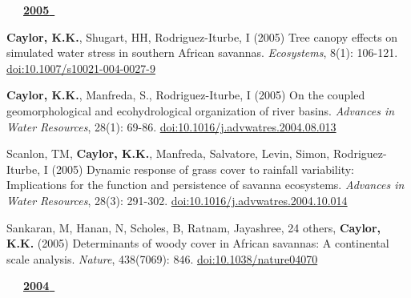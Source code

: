 \begin{etaremune}
\vspace{0.1in}
\mbox{\ \ \ \underline{\textbf{2005 }}}
\vspace{0.1in}

\item \textbf{ Caylor, K.K.}, Shugart, HH, Rodriguez-Iturbe, I (2005) Tree canopy effects on simulated water stress in southern African savannas. \emph{Ecosystems}, 8(1): 106-121. \href{https://doi.org/10.1007/s10021-004-0027-9}{doi:10.1007/s10021-004-0027-9}
\item \textbf{ Caylor, K.K.}, Manfreda, S., Rodriguez-Iturbe, I (2005) On the coupled geomorphological and ecohydrological organization of river basins. \emph{Advances in Water Resources}, 28(1): 69-86. \href{https://doi.org/10.1016/j.advwatres.2004.08.013}{doi:10.1016/j.advwatres.2004.08.013}
\item Scanlon, TM, \textbf{ Caylor, K.K.}, Manfreda, Salvatore, Levin, Simon, Rodriguez-Iturbe, I (2005) Dynamic response of grass cover to rainfall variability: Implications for the function and persistence of savanna ecosystems. \emph{Advances in Water Resources}, 28(3): 291-302. \href{https://doi.org/10.1016/j.advwatres.2004.10.014}{doi:10.1016/j.advwatres.2004.10.014}
\item Sankaran, M, Hanan, N, Scholes, B, Ratnam, Jayashree, 24 others, \textbf{ Caylor, K.K.} (2005) Determinants of woody cover in African savannas: A continental scale analysis. \emph{Nature}, 438(7069): 846. \href{https://doi.org/10.1038/nature04070}{doi:10.1038/nature04070}

\vspace{0.1in}
\mbox{\ \ \ \underline{\textbf{2004 }}}
\vspace{0.1in}


\end{etaremune}
